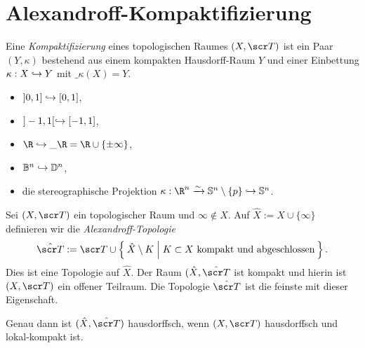 \section{Alexandroff-Kompaktifizierung}


\begin{df}
	Eine \emph{Kompaktifizierung} eines topologischen Raumes $(X, \scr T)$ ist ein Paar $(Y, \kappa)$ bestehend aus einem kompakten Hausdorff-Raum $Y$ und einer Einbettung $\kappa: X \hookrightarrow Y$ mit $\_{\kappa(X)} = Y$.
\end{df}

\begin{ex}
	\begin{itemize}
		\item
			$]0,1] \hookrightarrow [0,1]$,
		\item
			$]-1,1[ \hookrightarrow [-1,1]$,
		\item
			$\R \injto \_\R = \R \cup \{\pm\infty\}$,
		\item
			$\mathbb{B}^n \hookrightarrow \mathbb{D}^n$,
		\item
			die stereographische Projektion $\kappa: \R^n \homto \S^n \setminus \{p\} \injto \S^n$.
	\end{itemize}
\end{ex}

\begin{st}[Alexandroff]
	Sei $(X, \scr T)$ ein topologischer Raum und $\infty \not\in X$.
	Auf $\hat X := X \cup \{\infty\}$ definieren wir die \emph{Alexandroff-Topologie}
	\[
		\hat{\scr T} :=
		\scr T \cup \Set{ \hat X \setminus K | K \subset X \text{ kompakt und abgeschlossen} }.
	\]
	Dies ist eine Topologie auf $\hat X$.
	Der Raum $(\hat X, \hat{\scr T}$ ist kompakt und hierin ist $(X, \scr T)$ ein offener Teilraum.
	Die Topologie $\hat{\scr T}$ ist die feinste mit dieser Eigenschaft.

	Genau dann ist $(\hat X, \hat{\scr T})$ hausdorffsch, wenn $(X, \scr T)$ hausdorffsch und lokal-kompakt ist.
\end{st}

